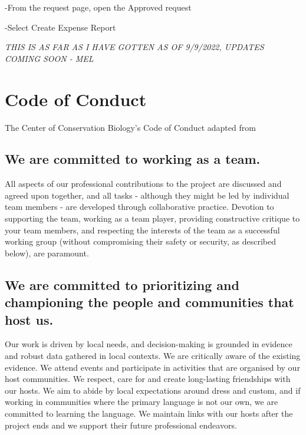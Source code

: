 \documentclass[
]{book}
\begin{document}
-From the request page, open the Approved request

-Select Create Expense Report

\emph{THIS IS AS FAR AS I HAVE GOTTEN AS OF 9/9/2022, UPDATES COMING SOON - MEL}

\hypertarget{codeofconduct}{%
\chapter{Code of Conduct}\label{codeofconduct}}

The Center of Conservation Biology's Code of Conduct adapted from \citep{Perry_2018}

\hypertarget{we-are-committed-to-working-as-a-team.}{%
\section{We are committed to working as a team.}\label{we-are-committed-to-working-as-a-team.}}

All aspects of our professional contributions to the project are discussed and agreed upon together, and all tasks - although they might be led by individual team members - are developed through collaborative practice. Devotion to supporting the team, working as a team player, providing constructive critique to your team members, and respecting the interests of the team as a successful working group (without compromising their safety or security, as described below), are paramount.

\hypertarget{we-are-committed-to-prioritizing-and-championing-the-people-and-communities-that-host-us.}{%
\section{We are committed to prioritizing and championing the people and communities that host us.}\label{we-are-committed-to-prioritizing-and-championing-the-people-and-communities-that-host-us.}}

Our work is driven by local needs, and decision-making is grounded in evidence and robust data gathered in local contexts. We are critically aware of the existing evidence. We attend events and participate in activities that are organised by our host communities. We respect, care for and create long-lasting friendships with our hosts. We aim to abide by local expectations around dress and custom, and if working in communities where the primary language is not our own, we are committed to learning the language. We maintain links with our hosts after the project ends and we support their future professional endeavors.
\end{document}
